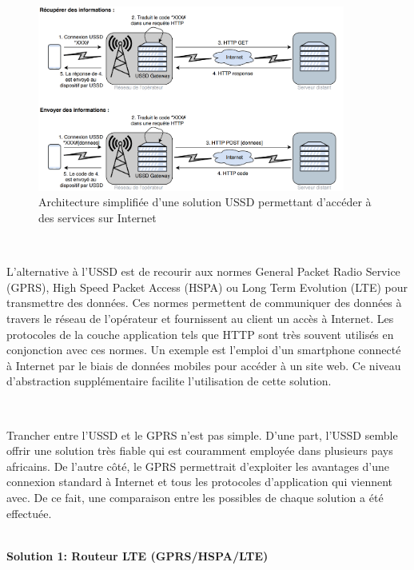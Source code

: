 \begin{figure}[ht!]
  \centering
  \includegraphics[width=0.90\textwidth]{img/el_prototype/ussd_examples.png}
  \caption{Architecture simplifiée d'une solution USSD permettant d'accéder à des services sur Internet}
  \label{fig:ussdex}
\end{figure}

~

\noindent
L'alternative à l'USSD est de recourir aux normes General Packet Radio Service (GPRS), High Speed Packet Access (HSPA) ou Long Term Evolution (LTE) pour transmettre des données. Ces normes permettent de communiquer des données à travers le réseau de l'opérateur et fournissent au client un accès à Internet. Les protocoles de la couche application tels que HTTP sont très souvent utilisés en conjonction avec ces normes. Un exemple est l'emploi d'un smartphone connecté à Internet par le biais de données mobiles pour accéder à un site web. Ce niveau d'abstraction supplémentaire facilite l'utilisation de cette solution.

~

\noindent
Trancher entre l'USSD et le GPRS n'est pas simple. D'une part, l'USSD semble offrir une solution très fiable qui est couramment employée dans plusieurs pays africains. De l'autre côté, le GPRS permettrait d'exploiter les avantages d'une connexion standard à Internet et tous les protocoles d'application qui viennent avec. De ce fait, une comparaison entre les possibles de chaque solution a été effectuée.


~
\\

\textbf{Solution 1: Routeur LTE (GPRS/HSPA/LTE)}

\vspace{-0.2cm}
~

